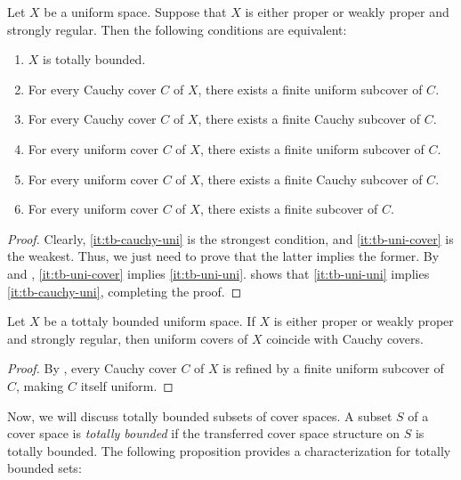 \documentclass[reqno]{amsart}
\theoremstyle{definition}
\theoremstyle{remark}
\numberwithin{figure}{section}
\begin{document}
\begin{prop}[tb-covers]
Let $X$ be a uniform space.
Suppose that $X$ is either proper or weakly proper and strongly regular.
Then the following conditions are equivalent:
\begin{enumerate}
\item \label{it:tb-tb} $X$ is totally bounded.
\item \label{it:tb-cauchy-uni} For every Cauchy cover $C$ of $X$, there exists a finite uniform subcover of $C$.
\item \label{it:tb-cauchy-cauchy} For every Cauchy cover $C$ of $X$, there exists a finite Cauchy subcover of $C$.
\item \label{it:tb-uni-uni} For every uniform cover $C$ of $X$, there exists a finite uniform subcover of $C$.
\item \label{it:tb-uni-cauchy} For every uniform cover $C$ of $X$, there exists a finite Cauchy subcover of $C$.
\item \label{it:tb-uni-cover} For every uniform cover $C$ of $X$, there exists a finite subcover of $C$.
\end{enumerate}
\end{prop}
\begin{proof}
Clearly, \eqref{it:tb-cauchy-uni} is the strongest condition, and \eqref{it:tb-uni-cover} is the weakest.
Thus, we just need to prove that the latter implies the former.
By  and , \eqref{it:tb-uni-cover} implies \eqref{it:tb-uni-uni}.
 shows that \eqref{it:tb-uni-uni} implies \eqref{it:tb-cauchy-uni}, completing the proof.
\end{proof}

\begin{cor}
Let $X$ be a tottaly bounded uniform space.
If $X$ is either proper or weakly proper and strongly regular, then uniform covers of $X$ coincide with Cauchy covers.
\end{cor}
\begin{proof}
By , every Cauchy cover $C$ of $X$ is refined by a finite uniform subcover of $C$, making $C$ itself uniform.
\end{proof}

Now, we will discuss totally bounded subsets of cover spaces.
A subset $S$ of a cover space is \emph{totally bounded} if the transferred cover space structure on $S$ is totally bounded.
The following proposition provides a characterization for totally bounded sets:
\end{document}
